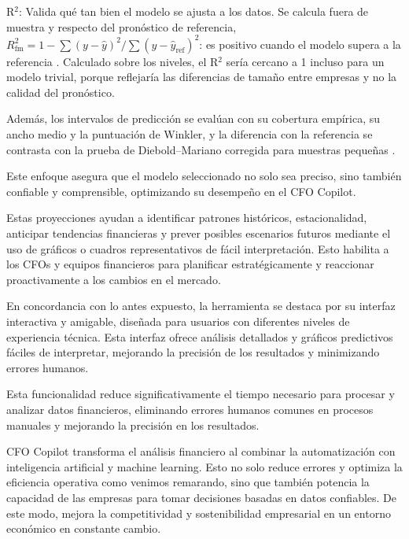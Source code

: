 \documentclass[12pt,letterpaper,oneside]{report}
\renewcommand{\_}{\UnderscoreOriginal\allowbreak}
\begin{document}
R$^2$: Valida qué tan bien el modelo se ajusta a los datos. Se calcula fuera de muestra y respecto del pronóstico de referencia, $R^2_{\text{fm}} = 1 - \sum (y - \hat{y})^2 / \sum (y - \hat{y}_{\text{ref}})^2$: es positivo cuando el modelo supera a la referencia \parencite{campbell2008predicting}. Calculado sobre los niveles, el R$^2$ sería cercano a 1 incluso para un modelo trivial, porque reflejaría las diferencias de tamaño entre empresas y no la calidad del pronóstico.

Además, los intervalos de predicción se evalúan con su cobertura empírica, su ancho medio y la puntuación de Winkler, y la diferencia con la referencia se contrasta con la prueba de Diebold--Mariano corregida para muestras pequeñas \parencite{harvey1997testing}.

Este enfoque asegura que el modelo seleccionado no solo sea preciso, sino también confiable y comprensible, optimizando su desempeño en el CFO Copilot.

Estas proyecciones ayudan a identificar patrones históricos, estacionalidad, anticipar tendencias financieras y prever posibles escenarios futuros mediante el uso de gráficos o cuadros representativos de fácil interpretación. Esto habilita a los CFOs y equipos financieros para planificar estratégicamente y reaccionar proactivamente a los cambios en el mercado.

En concordancia con lo antes expuesto, la herramienta se destaca por su interfaz interactiva y amigable, diseñada para usuarios con diferentes niveles de experiencia técnica. Esta interfaz ofrece análisis detallados y gráficos predictivos fáciles de interpretar, mejorando la precisión de los resultados y minimizando errores humanos.

Esta funcionalidad reduce significativamente el tiempo necesario para procesar y analizar datos financieros, eliminando errores humanos comunes en procesos manuales y mejorando la precisión en los resultados.

CFO Copilot transforma el análisis financiero al combinar la automatización con inteligencia artificial y machine learning. Esto no solo reduce errores y optimiza la eficiencia operativa como venimos remarando, sino que también potencia la capacidad de las empresas para tomar decisiones basadas en datos confiables. De este modo, mejora la competitividad y sostenibilidad empresarial en un entorno económico en constante cambio.
\end{document}
